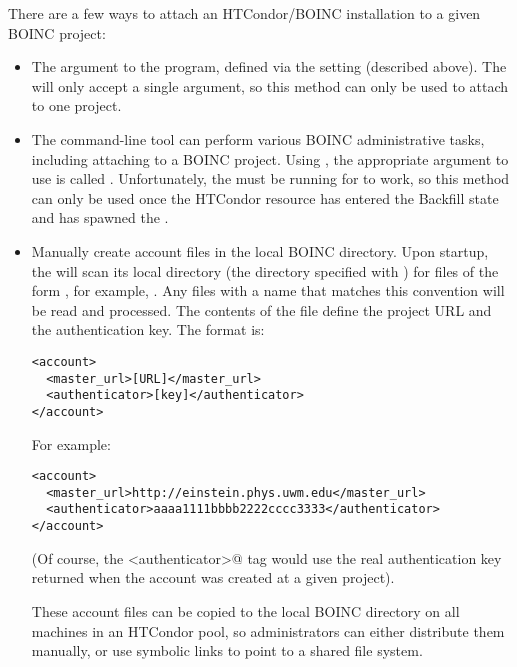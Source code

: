 There are a few ways to attach an HTCondor/BOINC installation to a given
BOINC project:
\begin{itemize}

\item The  argument to the 
  program, defined via the  setting
  (described above). 
  The  will only accept a single
   argument, so this method can only be used to
  attach to one project.

\item The  command-line tool can perform various
  BOINC administrative tasks, including attaching to a BOINC project.
  Using , the appropriate argument to use is called
  .
  Unfortunately, the  must be running for
   to work, so this method can only be used once the
  HTCondor resource has entered the Backfill state and has spawned the
  . 
  
\item Manually create account files in the local BOINC directory.
  Upon startup, the  will scan its local directory
  (the directory specified with )
  for files of the form , for example,
  . 
  Any files with a name that matches this convention will be read and
  processed.
  The contents of the file define the project URL and the
  authentication key.
  The format is:

\footnotesize
\begin{verbatim}
<account>
  <master_url>[URL]</master_url>
  <authenticator>[key]</authenticator>
</account>
\end{verbatim}
\normalsize

For example: 

\footnotesize
\begin{verbatim}
<account>
  <master_url>http://einstein.phys.uwm.edu</master_url>
  <authenticator>aaaa1111bbbb2222cccc3333</authenticator>
</account>
\end{verbatim}
\normalsize

(Of course, the \verb@<authenticator>@ tag would use the real
authentication key returned when the account was created at a given
project).

These account files can be copied to the local BOINC directory on all
machines in an HTCondor pool, so administrators can either distribute
them manually, or use symbolic links to point to a shared file
system. 

\end{itemize}

